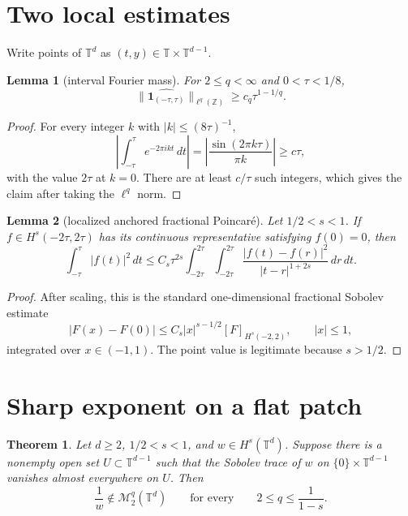 \documentclass[11pt]{article}
\newtheorem{theorem}{Theorem}
\newtheorem{lemma}{Lemma}
\newcommand{\T}{\mathbb T}
\newcommand{\Z}{\mathbb Z}
\newcommand{\M}{\mathcal M}
\begin{document}
\section{Two local estimates}

Write points of $\T^d$ as $(t,y)\in\T\times\T^{d-1}$.

\begin{lemma}[interval Fourier mass]\label{lem:fourier}
For $2\le q<\infty$ and $0<\tau<1/8$,
\[
 \big\|\widehat{\mathbf 1_{(-\tau,\tau)}}\big\|_{\ell^q(\Z)}
 \ge c_q\tau^{1-1/q}.
\]
\end{lemma}

\begin{proof}
For every integer $k$ with $|k|\le (8\tau)^{-1}$,
\[
 \left|\int_{-\tau}^{\tau}e^{-2\pi i kt}\,dt\right|
 =\left|\frac{\sin(2\pi k\tau)}{\pi k}\right|\ge c\tau,
\]
with the value $2\tau$ at $k=0$.  There are at least $c/\tau$ such integers,
which gives the claim after taking the $\ell^q$ norm.
\end{proof}

\begin{lemma}[localized anchored fractional Poincar\'e]\label{lem:poincare}
Let $1/2<s<1$.  If $f\in H^s(-2\tau,2\tau)$ has its continuous
representative satisfying $f(0)=0$, then
\[
 \int_{-\tau}^{\tau}|f(t)|^2\,dt
 \le C_s\tau^{2s}
 \int_{-2\tau}^{2\tau}\int_{-2\tau}^{2\tau}
 \frac{|f(t)-f(r)|^2}{|t-r|^{1+2s}}\,dr\,dt.
\]
\end{lemma}

\begin{proof}
After scaling, this is the standard one-dimensional fractional Sobolev
estimate
\[
 |F(x)-F(0)|\le C_s |x|^{s-1/2}[F]_{H^s(-2,2)},
 \qquad |x|\le1,
\]
integrated over $x\in(-1,1)$.  The point value is legitimate because
$s>1/2$.
\end{proof}

\section{Sharp exponent on a flat patch}

\begin{theorem}\label{thm:coordinate}
Let $d\ge2$, $1/2<s<1$, and $w\in H^s(\T^d)$.  Suppose there is a
nonempty open set $U\subset\T^{d-1}$ such that the Sobolev trace of $w$ on
$\{0\}\times\T^{d-1}$ vanishes almost everywhere on $U$.  Then
\[
 \frac1w\notin\M_2^q(\T^d)
 \qquad\text{for every}\qquad
 2\le q\le\frac1{1-s}.
\]
\end{theorem}
\end{document}
